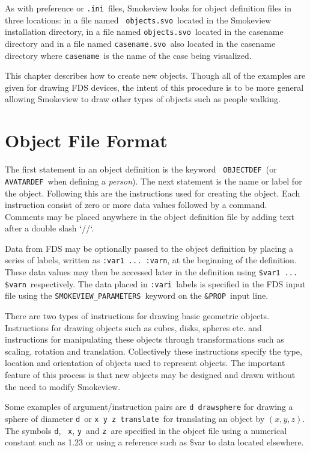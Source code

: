 \documentclass[11pt,twoside]{book}
\begin{document}
As with preference or {\tt .ini}\ files, Smokeview looks for
object definition files in three locations: in a file named {\tt
objects.svo}\ located in the Smokeview installation directory, in
a file named {\tt objects.svo}\ located in the casename directory
and in a file named {\tt casename.svo}\ also located in the
casename directory where {\tt casename}\ is the name of the case
being visualized.

This chapter describes how to create new objects. Though all of
the examples are given for drawing FDS devices, the intent of this
procedure is to be more general allowing Smokeview to draw other
types of objects such as people walking.

\section{Object File Format}
The first statement in an object definition is the keyword {\tt
OBJECTDEF}\ (or {\tt AVATARDEF}\ when defining a {\em person}). The
next statement is the name or label for the object. Following this
are the instructions used for creating the object. Each
instruction consist of zero or more data values followed by a
command. Comments may be placed anywhere in the object definition
file by adding text after a double slash `//`.

Data from FDS may be optionally passed to the object definition by
placing a series of labels, written as {\tt :var1 ... :varn}, at
the beginning of the definition.  These data values may then be
accessed later in the definition using {\tt \$var1 ... \$varn}\
respectively. The data placed in {\tt :vari}\ labels is specified
in the FDS input  file using the {\tt SMOKEVIEW\_PARAMETERS}\
keyword on the {\tt \&PROP}\ input line.

There are two types of instructions for drawing basic geometric
objects.  Instructions for drawing objects such as cubes, disks,
spheres etc.  and instructions for manipulating these objects
through transformations such as scaling, rotation and translation.
Collectively these instructions specify the type, location and
orientation of objects used to represent objects.  The important
feature of this process is that new objects may be designed and
drawn without the need to modify Smokeview.

Some examples of argument/instruction pairs are {\tt d drawsphere}
for drawing a sphere of diameter {\tt d}\ or {\tt x y z translate}\
for translating an object by $(x,y,z)$. The symbols {\tt d}, {\tt
x}, {\tt y}\ and {\tt z}\ are specified in the object file using a
numerical constant such as 1.23 or using a reference such as \$var
to data located elsewhere.
\end{document}
